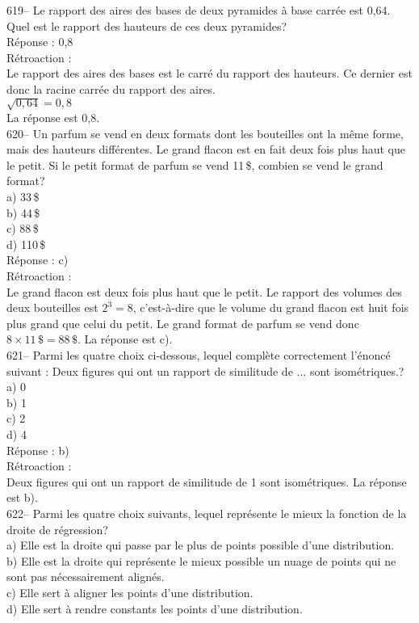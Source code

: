 ﻿\documentclass[letterpaper, 12pt]{article}
\begin{document}
619-- Le rapport des aires des bases de deux pyramides \`a base carr\'ee est
0,64.  Quel est le rapport des hauteurs de ces deux pyramides?\\

R\'eponse : 0,8\\

R\'etroaction : \\
Le rapport des aires des bases est le carr\'e du rapport des hauteurs.  Ce
dernier est donc la racine carr\'ee du rapport des aires.  \\
$\sqrt{0,64}=0,8$  \\
La r\'eponse est 0,8.\\


620-- Un parfum se vend en deux formats dont les bouteilles ont la m\^eme
forme, mais des hauteurs diff\'erentes.  Le grand flacon est en fait deux
fois plus haut que le petit.  Si le petit format de parfum se vend 11\,\$,
combien se vend le grand format?\\
a) 33\,\$\\
b) 44\,\$\\
c) 88\,\$\\
d) 110\,\$\\

R\'eponse : c)\\

R\'etroaction : \\
Le grand flacon est deux fois plus haut que le petit. Le rapport des volumes
des deux bouteilles est $2^{3}=8$, c'est-\`a-dire que le volume du grand
flacon est huit fois plus grand que celui du petit.  Le grand format de
parfum se vend donc $8\times11\,\$=88\,\$$.  La r\'eponse est c).\\


621-- Parmi les quatre choix ci-dessous, lequel compl\`ete
correctement l'\'enonc\'e suivant : \og Deux figures qui ont un
rapport de similitude de $\ldots$ sont isom\'etriques.\fg?\\
a) 0\\
b) 1\\
c) 2\\
d) 4\\

R\'eponse : b) \\

R\'etroaction : \\
Deux figures qui ont un rapport de similitude de 1 sont isom\'etriques.  La
r\'eponse est b).\\


622-- Parmi les quatre choix suivants, lequel repr\'esente le mieux la
fonction de la droite de r\'egression?\\
a) Elle est la droite qui passe par le plus de points possible d'une
distribution.\\
b) Elle est la droite qui repr\'esente le mieux possible un nuage de points
qui ne sont pas n\'ecessairement align\'es.\\
c) Elle sert \`a aligner les points d'une distribution.\\
d) Elle sert \`a rendre constants les points d'une distribution.\\
\end{document}

